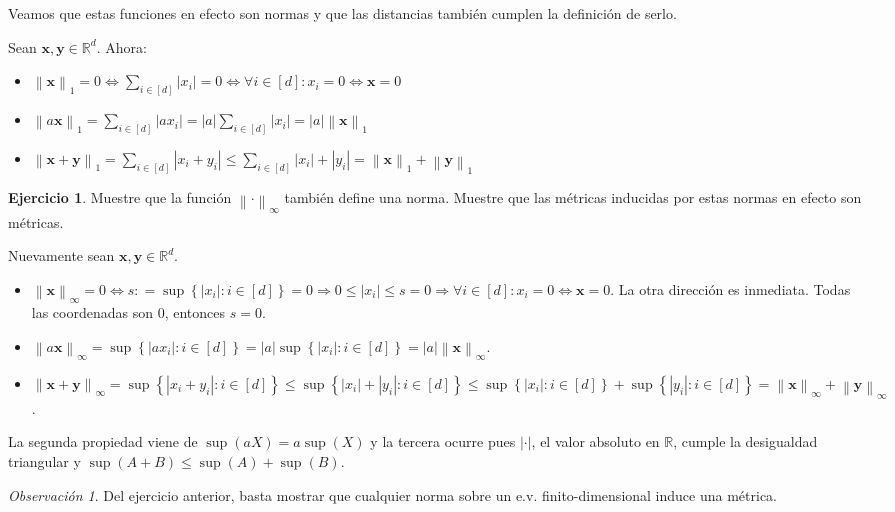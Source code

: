 \documentclass[12pt]{article}
\theoremstyle{plain}
\theoremstyle{definition}
\newtheorem{Ej}[Th]{Ejercicio}
\theoremstyle{remark}
\newtheorem{Rmk}[Th]{Observación}      %
\numberwithin{equation}{section}
\newcommand{\bR}{\mathbb{R}}        %
\renewcommand{\leq}{\leqslant}      %
\renewcommand{\:}{\colon}           %
\renewcommand{\vec}[1]{\mathbf{#1}}
\newcommand{\vx}{\vec{x}}           %
\newcommand{\vy}{\vec{y}}
\newcommand{\conj}[1]{\left\lbrace#1\right\rbrace}
\newcommand{\bonj}[1]{\left\lbrack#1\right\rbrack}
\newcommand{\nm}[1]{\left\|#1\right\|} %
\begin{document}
\begin{multicols}{2}
Veamos que estas funciones en efecto son normas y que las distancias también cumplen la definición de serlo.
\begin{ptcbp}
Sean $\vx,\vy\in\bR^d$. Ahora:
\begin{itemize}
  \item $\nm{\vx}_1=0\iff \sum_{i\in\bonj{d}}|x_i|=0 \iff \forall i\in\bonj{d}\colon x_i=0 \iff \vx=0$
  \item $\nm{a\vx}_1=\sum_{i\in\bonj{d}}|ax_i|=|a|\sum_{i\in\bonj{d}}|x_i|=|a|\nm{\vx}_1$
  \item $\nm{\vx+\vy}_1=\sum_{i\in\bonj{d}}|x_i+y_i|\leq\sum_{i\in\bonj{d}}|x_i|+|y_i|=\nm{\vx}_1+\nm{\vy}_1$
\end{itemize}


\end{ptcbp}

\begin{Ej}
  Muestre que la función $\nm{\cdot}_\infty$ también define una norma. Muestre que las métricas inducidas por estas normas en efecto son métricas.
\end{Ej}

\begin{ptcb}
Nuevamente sean $\vx,\vy\in\bR^d$.
\begin{itemize}
  \item $\nm{\vx}_\infty = 0\iff s\colon=\sup\conj{|x_i|\colon i\in\bonj{d}}=0\Rightarrow 0\leq|x_i|\leq s =0\Rightarrow \forall i\in\bonj{d}\colon x_i=0 \iff \vx=0 $. La otra dirección es inmediata. Todas las coordenadas son 0, entonces $s=0$.
  \item $\nm{a\vx}_\infty=\sup\conj{|ax_i|\colon i\in\bonj{d}}=|a|\sup\conj{|x_i|\colon i\in\bonj{d}}=|a|\nm{\vx}_\infty$.
  \item $\nm{\vx+\vy}_\infty=\sup\conj{|x_i+y_i|\colon i\in\bonj{d}}\leq\sup\conj{|x_i|+|y_i|\colon i\in\bonj{d}}\leq\sup\conj{|x_i|\colon i\in\bonj{d}}+\sup\conj{|y_i|\colon i\in\bonj{d}}=\nm{\vx}_\infty+\nm{\vy}_\infty$.
\end{itemize}
La segunda propiedad viene de $\sup(aX)=a\sup(X)$ y la tercera ocurre pues $|\cdot|$, el valor absoluto en $\bR$, cumple la desigualdad triangular y $\sup(A+B)\leq\sup(A)+\sup(B)$.
\end{ptcb}


\begin{Rmk}
  Del ejercicio anterior, basta mostrar que cualquier norma sobre un e.v. finito-dimensional induce una métrica.
\end{Rmk}


\end{multicols}
\end{document}
